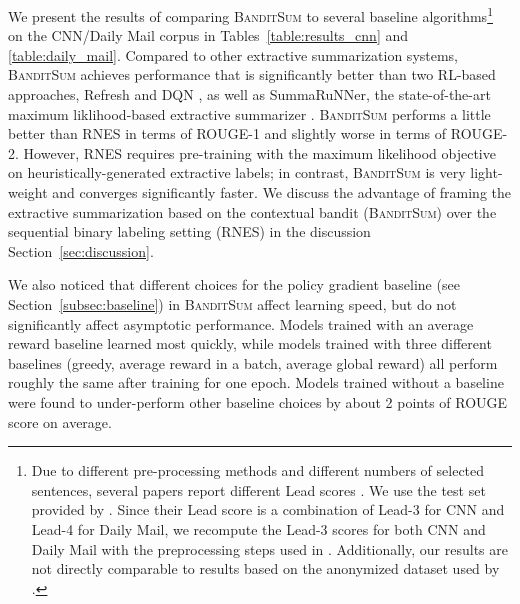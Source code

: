 \documentclass[11pt,a4paper]{article}
\newcommand{\B}{\textsc{BanditSum }}
\begin{document}
We present the results of comparing \B to several baseline algorithms\footnote{
Due to different pre-processing methods and different numbers of selected sentences, several papers report different Lead scores \citep{DBLP:Narayan/2018,abs4_SeeLM17}. 
We use the test set provided by \citet{DBLP:Narayan/2018}. Since their Lead score is a combination of Lead-3 for CNN and Lead-4 for Daily Mail, we recompute the Lead-3 scores for both CNN and Daily Mail with the preprocessing steps used in \citet{abs4_SeeLM17}. Additionally, our results are not directly comparable to results based on the anonymized dataset used by \citet{ext5_summarunner}.} 
on the CNN/Daily Mail corpus in Tables~\ref{table:results_cnn} and \ref{table:daily_mail}. 
Compared to other extractive summarization systems, \B achieves performance that is significantly better than two RL-based approaches, Refresh \citep{DBLP:Narayan/2018} and DQN \citep{yao2018deep}, as well as SummaRuNNer, the state-of-the-art maximum liklihood-based extractive summarizer \cite{ext5_summarunner}. \B performs a little better than RNES \citep{DBLP:conf/aaai/WuH18} in terms of ROUGE-1 and slightly worse in terms of ROUGE-2. However, RNES requires pre-training with the maximum likelihood objective on heuristically-generated extractive labels; in contrast, \B is very light-weight and converges significantly faster. We discuss the advantage of framing the extractive summarization based on the contextual bandit (\textsc{BanditSum}) over the sequential binary labeling setting (RNES) in the discussion Section~\ref{sec:discussion}. 





We also noticed that different choices for the policy gradient baseline (see Section~\ref{subsec:baseline}) in \B affect learning speed, but do not significantly affect asymptotic performance. Models trained with an average reward baseline learned most quickly, while models trained with three different baselines (greedy, average reward in a batch, average global reward) all perform roughly the same after training for one epoch. Models trained without a baseline were found to under-perform other baseline choices by about 2 points of ROUGE score on average.  
\end{document}
